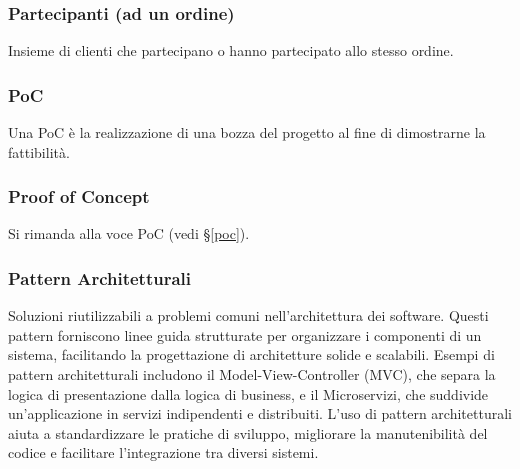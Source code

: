 
\subsubsection*{Partecipanti (ad un ordine)}
Insieme di clienti che partecipano o hanno partecipato allo stesso ordine.

\subsubsection*{PoC}
\label{poc}
Una PoC è la realizzazione di una bozza del progetto al fine di dimostrarne la fattibilità.

\subsubsection*{Proof of Concept}
Si rimanda alla voce PoC (vedi \S\ref{poc}).

\subsubsection*{Pattern Architetturali}
Soluzioni riutilizzabili a problemi comuni nell'architettura dei software. Questi pattern forniscono linee guida strutturate per organizzare i componenti di un sistema, 
facilitando la progettazione di architetture solide e scalabili. Esempi di pattern architetturali includono il Model-View-Controller (MVC), 
che separa la logica di presentazione dalla logica di business, e il Microservizi, che suddivide un'applicazione in servizi indipendenti e distribuiti. 
L'uso di pattern architetturali aiuta a standardizzare le pratiche di sviluppo, migliorare la manutenibilità del codice e facilitare l'integrazione tra diversi sistemi.

\newpage
